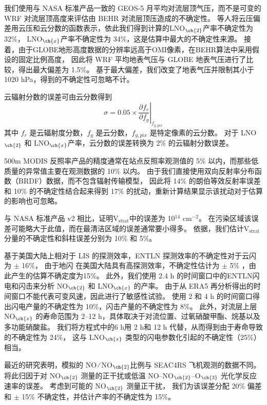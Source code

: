 我们使用与 NASA 标准产品一致的 GEOS-5 月平均对流层顶气压，而不是可变的 WRF 对流层顶高度来评估由 BEHR 对流层顶压造成的不确定性。
\citet{Acarreta.2004}等人将云压偏差用云压和云分数的函数表示，依此我们得到计算的LNO$_{\ch{2}}$产率不确定性为 32\%，
LNO$_{\ch{x}}$产率不确定性为 34\%，这是估算中最大的不确定性来源。
接着，由于GLOBE地形高度数据的分辨率远高于OMI像素，在BEHR算法中采用假设的固定比例高度，
因此\citet{Laughner.2019a}将 WRF 平均地表气压与 GLOBE 地表气压进行了比较，得出最大偏差为 1.5\%。
基于最大偏差，我们改变了地表气压并限制其小于 1020 hPa，得到的不确定性可忽略不计。

云辐射分数的误差可由云分数得到
\begin{equation}
\sigma = 0.05 \times \left.\frac{\partial{f_r}}{\partial{f_g}}\right|_{f_{g,pix}}
\end{equation}
其中 $f_r$ 是云辐射度分数，$f_g$ 是云分数，$f_{g,pix}$ 是特定像素的云分数。
对于 LNO$_{\ch{2}}$ 和 LNO$_{\ch{x}}$产率，云分数的误差转换为 2\% 的云辐射分数误差。

500m MODIS 反照率产品的精度通常在站点反照率观测值的 5\% 以内，而那些低质量的异常值主要在观测数据的 10\% 以内\citep{Schaaf.2011}。
由于我们直接使用双向反射率分布函数（BRDF）数据，而不包含辐射传输模型，
因此将 14\% 的朗伯等效反射率误差和 10\% 的不确定性结合起来得到 17\% 的扰动\citep{Laughner.2019a}，重新计算结果显示该扰动对于估算的影响也可忽略。

与 NASA 标准产品 v2 相比，\citet{Krotkov.2017}证明V$_\textrm{strat}$中的误差为 10$^{14}$ cm$^{-2}$。
在污染区域该误差可能略大于此值，而在最清洁区域的误差通常要小得多\citep{Bucsela.2013}。
依据\citet{Allen.2019}，我们估计V$_\textrm{strat}$分量的不确定性和斜柱误差分别为 10\% 和 5\%。

基于美国大陆上相对于 LIS 的探测效率，ENTLN 探测效率的不确定性对于云闪为 $\pm$ 16\%，
由于地闪 在美国大陆具有高探测效率，不确定性估计为 $\pm$ 5\% \citep{Lapierre.2020}，由此产生的估算不确定度为15\%。
此外，我们使用 2.4 h 的时间窗口中的ENTLN闪电和闪击来分析 NO$_{\ch{2}}$ 和 LNO$_{\ch{x}}$ 的产率。
由于从 ERA5 再分析得出的时间窗口不能代表可变风速，因此进行了敏感性试验。
使用 2 和 4 h 的时间窗口得出闪电产量的不确定性为 10\%，闪击产量的不确定性为 8\%。
此外，对流层上层NO$_{\ch{x}}$ 的寿命范围为 2--12 h，具体取决于对流位置、过氧硝酸甲酯、烷基以及多功能硝酸盐\citep{Nault.2017}。
我们将方程式中的6 h用 2 h和 12 h 代替，从而得到由于寿命导致的不确定性为 24\%，
这与 LNO$_{\ch{x}}$ 类型的闪电参数化引起的不确定性（25\%）相当。

最近的研究表明，模拟的 NO ∕ NO$_{\ch{2}}$比例与 SEAC4RS 飞机观测的数据不同\citep{Travis.2016,Silvern.2018}。
\citet{Silvern.2018}将此归因于对 NO$_{\ch{2}}$ 测量的正干扰或低温 NO--NO$_{\ch{2}}$--O$_{\ch{3}}$ 光化学反应速率的误差。
考虑到可能的 NO$_{\ch{2}}$ 测量正干扰\citep{Allen.2019,Bucsela.2019}，
我们为该误差分配 20\% 偏差和 $\pm$ 15\% 不确定性，并估计产率的不确定性为 15\%。

